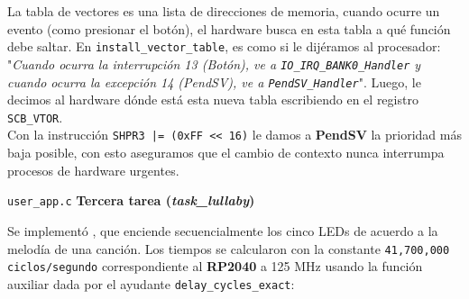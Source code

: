 \documentclass[12pt,letterpaper]{article}
\begin{document}
\bigskip

\noindent
La tabla de vectores es una lista de direcciones de memoria, cuando ocurre un evento (como presionar el botón), el hardware busca en esta tabla a qué función debe saltar. En \texttt{install\_vector\_table}, es como si le dijéramos al procesador: "\textit{Cuando ocurra la interrupción 13 (Botón), ve a \texttt{IO\_IRQ\_BANK0\_Handler} y cuando ocurra la excepción 14 (PendSV), ve a \texttt{PendSV\_Handler}}". Luego, le decimos al hardware dónde está esta nueva tabla escribiendo en el registro \texttt{SCB\_VTOR}.\\

\noindent
Con la instrucción \texttt{SHPR3 |= (0xFF << 16)} le damos a \textbf{PendSV} la prioridad más baja posible, con esto aseguramos que el cambio de contexto nunca interrumpa procesos de hardware urgentes.

\bigskip

\texttt{user\_app.c} \textbf{Tercera tarea (\textit{task\_lullaby})}

\noindent
Se implementó , que enciende secuencialmente los cinco LEDs de acuerdo a la melodía de una canción. Los tiempos se calcularon con la constante \texttt{41,700,000 ciclos/segundo} correspondiente al \textbf{RP2040} a 125 MHz usando la función auxiliar dada por el ayudante \texttt{delay\_cycles\_exact}:
\end{document}
